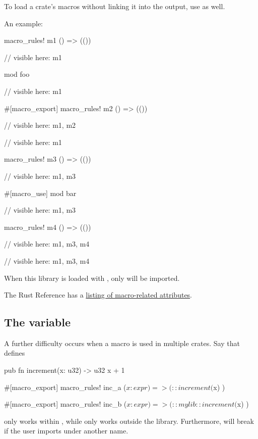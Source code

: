 \blank

To load a crate's macros without linking it into the output, use \code{\#[no\_link]} as well.

\blank

An example:

\begin{rustc}
macro_rules! m1 { () => (()) }

// visible here: m1

mod foo {
    // visible here: m1

    #[macro_export]
    macro_rules! m2 { () => (()) }

    // visible here: m1, m2
}

// visible here: m1

macro_rules! m3 { () => (()) }

// visible here: m1, m3

#[macro_use]
mod bar {
    // visible here: m1, m3

    macro_rules! m4 { () => (()) }

    // visible here: m1, m3, m4
}

// visible here: m1, m3, m4
\end{rustc}

When this library is loaded with , only  will be imported.

\blank

The Rust Reference has a \href{https://doc.rust-lang.org/reference.html\#macro-related-attributes}{listing of macro-related attributes}.

\subsection*{The variable }

A further difficulty occurs when a macro is used in multiple crates. Say that  defines

\begin{rustc}
pub fn increment(x: u32) -> u32 {
    x + 1
}

#[macro_export]
macro_rules! inc_a {
    ($x:expr) => ( ::increment($x) )
}

#[macro_export]
macro_rules! inc_b {
    ($x:expr) => ( ::mylib::increment($x) )
}
\end{rustc}

 only works within , while  only works outside the library. Furthermore,  will break 
if the user imports  under another name.

